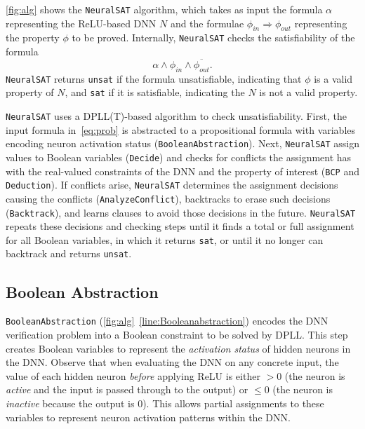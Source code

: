 \documentclass[oneside,11pt,dvipsnames]{book}
\numberwithin{equation}{section}
\theoremstyle{definition}
\theoremstyle{remark}
\newcommand{\tool}{\texttt{NeuralSAT}}
\begin{document}
\autoref{fig:alg} shows the \tool{} algorithm, which takes as input the formula $\alpha$ representing the ReLU-based DNN $N$ and the formulae $\phi_{in}\Rightarrow \phi_{out}$ representing the property $\phi$ to be proved.
Internally, \tool{} checks the satisfiability of the formula
\begin{equation}\label{eq:prob}
  \alpha \land \phi_{in} \land \overline{\phi_{out}}.
\end{equation}
\tool{} returns \texttt{unsat} if the formula unsatisfiable, indicating  that $\phi$ is a valid property of $N$, and \texttt{sat} if it is satisfiable, indicating the $N$ is not a valid property.

\tool{} uses a  DPLL(T)-based algorithm to check unsatisfiability.
First, the input formula in~\autoref{eq:prob} is abstracted to a propositional formula
with variables encoding neuron activation status (\texttt{BooleanAbstraction}).
Next, \tool{} assign values to Boolean variables (\texttt{Decide}) and checks for conflicts the assignment has with the real-valued constraints of the DNN and the property of interest (\texttt{BCP} and \texttt{Deduction}).
If conflicts arise, \tool{} determines the assignment decisions causing the conflicts (\texttt{AnalyzeConflict}), backtracks to erase such decisions (\texttt{Backtrack}), and learns clauses to avoid those decisions in the future.
\tool{} repeats these decisions and checking steps until it finds a total or full assignment for all Boolean variables, in which it returns \texttt{sat}, or until it no longer can backtrack and returns \texttt{unsat}.




\subsection{Boolean Abstraction}
\texttt{BooleanAbstraction} (\autoref{fig:alg}~\autoref{line:Booleanabstraction}) encodes the DNN verification problem into a Boolean constraint to be solved by DPLL.  This step creates Boolean variables to represent the \emph{activation status} of hidden neurons in the DNN. Observe that when evaluating the DNN on any concrete input, the value of each hidden neuron \emph{before} applying ReLU is either $>0$ (the neuron is \emph{active} and the input is passed through to the output) or $\le 0$ (the neuron is \emph{inactive} because the output is 0).
This allows partial assignments to these variables to represent neuron activation patterns within the DNN.
\end{document}
